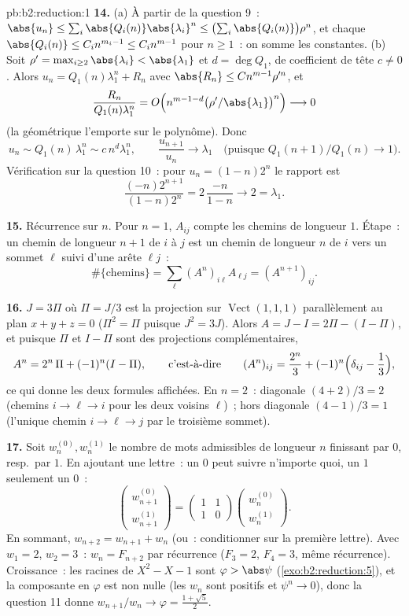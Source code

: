 \begin{solution}{pb:b2:reduction:1}
\textbf{14.} (a) À partir de la question 9~: $\abs{u_n} \leq \sum_i
\abs{Q_i(n)}\abs{\lambda_i}^n \leq \bigl(\sum_i
\abs{Q_i(n)}\bigr)\rho^n$, et chaque $\abs{Q_i(n)} \leq C_i
n^{m_i - 1} \leq C_i n^{m-1}$ pour $n \geq 1$~: on somme les
constantes. (b) Soit $\rho' = \max_{i \geq 2}\abs{\lambda_i} <
\abs{\lambda_1}$ et $d = \deg Q_1$, de coefficient de tête $c \neq 0$.
Alors $u_n = Q_1(n)\lambda_1^n + R_n$ avec $\abs{R_n} \leq
Cn^{m-1}\rho'^n$, et
\[
\frac{R_n}{Q_1(n)\lambda_1^n} = O\Bigl(n^{m-1-d}
\bigl(\rho'/\abs{\lambda_1}\bigr)^n\Bigr) \longrightarrow 0
\]
(la géométrique l'emporte sur le polynôme). Donc
\[
u_n \sim Q_1(n)\,\lambda_1^n \sim c\,n^d\lambda_1^n,
\qquad
\frac{u_{n+1}}{u_n} \longrightarrow \lambda_1
\quad\text{(puisque } Q_1(n{+}1)/Q_1(n) \to 1\text{)}.
\]
Vérification sur la question 10~: pour $u_n = (1-n)2^n$ le rapport est
\[
\frac{(-n)2^{n+1}}{(1-n)2^n} = 2\,\frac{-n}{1-n}
\longrightarrow 2 = \lambda_1 .
\]

\textbf{15.} Récurrence sur $n$. Pour $n = 1$, $A_{ij}$ compte les
chemins de longueur $1$. Étape~: un chemin de longueur $n + 1$ de $i$
à $j$ est un chemin de longueur $n$ de $i$ vers un sommet $\ell$ suivi
d'une arête $\ell j$~:
\[
\#\{\text{chemins}\} = \sum_{\ell} (A^n)_{i\ell}A_{\ell j} =
(A^{n+1})_{ij}.
\]

\textbf{16.} $J = 3\Pi$ où $\Pi = J/3$ est la projection sur
$\operatorname{Vect}(1,1,1)$ parallèlement au plan $x + y + z = 0$
($\Pi^2 = \Pi$ puisque $J^2 = 3J$). Alors $A = J - I = 2\Pi - (I -
\Pi)$, et puisque $\Pi$ et $I - \Pi$ sont des projections
complémentaires,
\[
A^n = 2^n\,\Pi + (-1)^n (I - \Pi),
\qquad\text{c'est-à-dire}\qquad
(A^n)_{ij} = \frac{2^n}3 + (-1)^n\Bigl(\delta_{ij} -
\frac13\Bigr),
\]
ce qui donne les deux formules affichées. En $n = 2$~: diagonale
$(4 + 2)/3 = 2$ (chemins $i \to \ell \to i$ pour les deux voisins
$\ell$)~; hors diagonale $(4 - 1)/3 = 1$ (l'unique chemin $i \to
\ell \to j$ par le troisième sommet).

\textbf{17.} Soit $w_n^{(0)}, w_n^{(1)}$ le nombre de mots admissibles
de longueur $n$ finissant par $0$, resp.\ par $1$. En ajoutant une
lettre~: un $0$ peut suivre n'importe quoi, un $1$ seulement un $0$~:
\[
\begin{pmatrix} w_{n+1}^{(0)}\\ w_{n+1}^{(1)}\end{pmatrix}
= \begin{pmatrix} 1 & 1\\ 1 & 0\end{pmatrix}
\begin{pmatrix} w_n^{(0)}\\ w_n^{(1)}\end{pmatrix}.
\]
En sommant, $w_{n+2} = w_{n+1} + w_n$ (ou~: conditionner sur la
première lettre). Avec $w_1 = 2$, $w_2 = 3$~: $w_n = F_{n+2}$ par
récurrence ($F_3 = 2$, $F_4 = 3$, même récurrence). Croissance~: les
racines de $X^2 - X - 1$ sont $\varphi > \abs\psi$
(\cref{exo:b2:reduction:5}), et la composante en $\varphi$ est non
nulle (les $w_n$ sont positifs et $\psi^n \to 0$), donc la question 11
donne $w_{n+1}/w_n \to \varphi = \frac{1 + \sqrt5}2$.


\end{solution}
